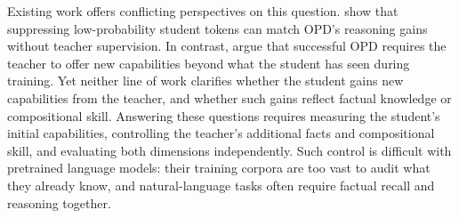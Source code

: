 \documentclass[]{template}
\theoremstyle{plain}
\theoremstyle{definition}
\theoremstyle{remark}
\begin{document}


Existing work offers conflicting perspectives on this question. \citet{ding2026does} show that suppressing low-probability student tokens can match OPD's reasoning gains without teacher supervision. In contrast, \citet{li2026rethinking} argue that successful OPD requires the teacher to offer new capabilities beyond what the student has seen during training. Yet neither line of work clarifies whether the student gains new capabilities from the teacher, and whether such gains reflect factual knowledge or compositional skill. Answering these questions requires measuring the student's initial capabilities, controlling the teacher's additional facts and compositional skill, and evaluating both dimensions independently. Such control is difficult with pretrained language models: their training corpora are too vast to audit what they already know, and natural-language tasks often require factual recall and reasoning together.
\end{document}
